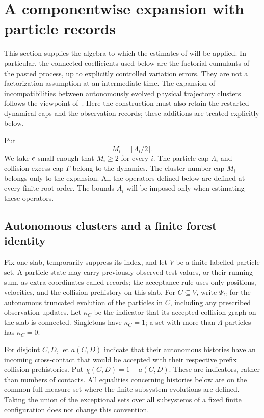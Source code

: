 \section{A componentwise expansion with particle records}
\label{sec:cluster-expansion}

This section supplies the algebra to which the estimates of
 will be applied.  In particular, the connected
coefficients used below are the factorial cumulants of the pasted process,
up to explicitly controlled variation errors.  They are not a factorization
assumption at an intermediate time. The expansion of incompatibilities
between autonomously evolved physical trajectory clusters follows the
viewpoint of~\cite{BGSSCluster2022}. Here the construction must also
retain the restarted dynamical caps and the observation records;
these additions are treated explicitly below.

Put
\begin{equation}\label{eq:cluster-threshold}
 M_i=\lfloor\Lambda_i/2\rfloor.
\end{equation}
We take $\epsilon$ small enough that $M_i\ge2$ for every $i$.  The particle cap
$\Lambda_i$ and collision-excess cap $\Gamma$ belong to the dynamics.  The
cluster-number cap $M_i$ belongs only to the expansion.  All the operators
defined below are defined at every finite root order.  The bounds $A_i$ will
be imposed only when estimating these operators.

\subsection{Autonomous clusters and a finite forest identity}

Fix one slab, temporarily suppress its index, and let $V$ be a finite
labelled particle set.  A particle state may carry previously observed
test values, or their running sum, as extra coordinates called records;
the acceptance rule uses only positions, velocities, and the collision
prehistory on this slab.  For $C\subseteq V$, write $\Psi_C$ for the
autonomous truncated evolution of the particles in $C$, including any
prescribed observation updates.  Let $\kappa_C$ be the indicator that its
accepted collision graph on the slab is connected.  Singletons have
$\kappa_C=1$; a set with more than $\Lambda$ particles has
$\kappa_C=0$.

For disjoint $C,D$, let $a(C,D)$ indicate that their autonomous histories
have an incoming cross-contact that would be accepted with their respective
prefix collision prehistories.  Put $\chi(C,D)=1-a(C,D)$.  These are
indicators, rather than numbers of contacts.  All equalities concerning
histories below are on the common full-measure set where the finite
subsystem evolutions are defined.  Taking the union of the exceptional
sets over all subsystems of a fixed finite configuration does not change
this convention.

